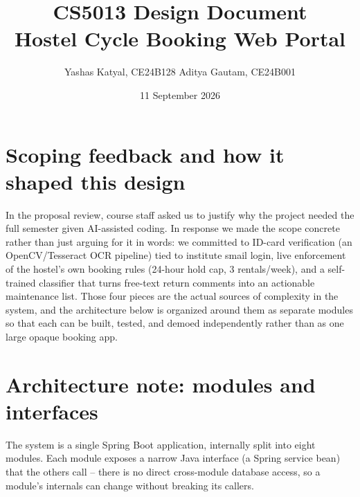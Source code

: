 \documentclass[11pt]{article}
\title{CS5013 Design Document \\ \large Hostel Cycle Booking Web Portal}
\author{Yashas Katyal, CE24B128 \qquad Aditya Gautam, CE24B001}
\date{11 September 2026}
\begin{document}
\maketitle

\section{Scoping feedback and how it shaped this design}
In the proposal review, course staff asked us to justify why the project needed the full semester given AI-assisted coding. In response we made the scope concrete rather than just arguing for it in words: we committed to ID-card verification (an OpenCV/Tesseract OCR pipeline) tied to institute smail login, live enforcement of the hostel's own booking rules (24-hour hold cap, 3 rentals/week), and a self-trained classifier that turns free-text return comments into an actionable maintenance list. Those four pieces are the actual sources of complexity in the system, and the architecture below is organized around them as separate modules so that each can be built, tested, and demoed independently rather than as one large opaque booking app.

\section{Architecture note: modules and interfaces}
The system is a single Spring Boot application, internally split into eight modules. Each module exposes a narrow Java interface (a Spring service bean) that the others call -- there is no direct cross-module database access, so a module's internals can change without breaking its callers.
\end{document}
